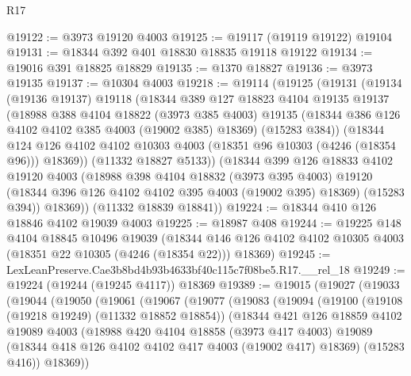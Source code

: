 \begin{lexlean}{R17}
\begin{coremodule}
@19122 := @3973 @19120 @4003
@19125 := @19117 (@19119 @19122) @19104
@19131 := @18344 @392 @401 @18830 @18835 @19118 @19122
@19134 := @19016 @391 @18825 @18829
@19135 := @1370 @18827
@19136 := @3973 @19135
@19137 := @10304 @4003
@19218 := @19114
    (@19125
      (@19131
        (@19134
          (@19136 @19137)
          @19118
          (@18344
            @389
            @127
            @18823
            @4104
            @19135
            @19137
            (@18988
              @388
              @4104
              @18822
              (@3973 @385 @4003)
              @19135
              (@18344 @386 @126 @4102 @4102 @385 @4003 (@19002 @385) @18369)
              (@15283 @384))
            (@18344
              @124
              @126
              @4102
              @4102
              @10303
              @4003
              (@18351 @96 @10303 (@4246 (@18354 @96)))
              @18369))
          (@11332 @18827 @5133))
        (@18344
          @399
          @126
          @18833
          @4102
          @19120
          @4003
          (@18988
            @398
            @4104
            @18832
            (@3973 @395 @4003)
            @19120
            (@18344 @396 @126 @4102 @4102 @395 @4003 (@19002 @395) @18369)
            (@15283 @394))
          @18369))
      (@11332 @18839 @18841))
@19224 := @18344 @410 @126 @18846 @4102 @19039 @4003
@19225 := @18987 @408
@19244 := @19225
    @148
    @4104
    @18845
    @10496
    @19039
    (@18344 @146 @126 @4102 @4102 @10305 @4003 (@18351 @22 @10305 (@4246 (@18354 @22))) @18369)
@19245 := LexLeanPreserve.Cae3b8bd4b93b4633bf40c115c7f08be5.R17.__rel_18
@19249 := @19224 (@19244 (@19245 @4117)) @18369
@19389 := @19015
    (@19027
      (@19033
        (@19044
          (@19050
            (@19061
              (@19067
                (@19077
                  (@19083
                    (@19094
                      (@19100
                        (@19108 (@19218 @19249) (@11332 @18852 @18854))
                        (@18344
                          @421
                          @126
                          @18859
                          @4102
                          @19089
                          @4003
                          (@18988
                            @420
                            @4104
                            @18858
                            (@3973 @417 @4003)
                            @19089
                            (@18344 @418 @126 @4102 @4102 @417 @4003 (@19002 @417) @18369)
                            (@15283 @416))
                          @18369))

\end{coremodule}
\end{lexlean}
